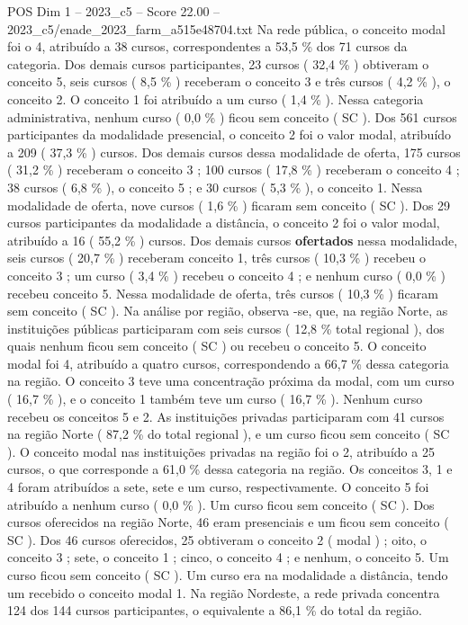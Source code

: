 \begin{textsample}{POS Dim 1 – 2023\_c5 – Score 22.00 – 2023\_c5/enade\_2023\_farm\_a515e48704.txt}
Na rede pública, o conceito modal foi o 4, atribuído a 38 cursos, correspondentes a 53,5 \% dos 71 cursos da categoria.
Dos demais cursos participantes, 23 cursos ( 32,4 \% ) obtiveram o conceito 5, seis cursos ( 8,5 \% ) receberam o conceito 3 e três cursos ( 4,2 \% ), o conceito 2.
O conceito 1 foi atribuído a um curso ( 1,4 \% ).
Nessa categoria administrativa, nenhum curso ( 0,0 \% ) ficou sem conceito ( SC ).
Dos 561 cursos participantes da modalidade presencial, o conceito 2 foi o valor modal, atribuído a 209 ( 37,3 \% ) cursos.
Dos demais cursos dessa modalidade de oferta, 175 cursos ( 31,2 \% ) receberam o conceito 3 ; 100 cursos ( 17,8 \% ) receberam o conceito 4 ; 38 cursos ( 6,8 \% ), o conceito 5 ; e 30 cursos ( 5,3 \% ), o conceito 1.
Nessa modalidade de oferta, nove cursos ( 1,6 \% ) ficaram sem conceito ( SC ).
Dos 29 cursos participantes da modalidade a distância, o conceito 2 foi o valor modal, atribuído a 16 ( 55,2 \% ) cursos.
Dos demais cursos \textbf{ofertados} nessa modalidade, seis cursos ( 20,7 \% ) receberam conceito 1, três cursos ( 10,3 \% ) recebeu o conceito 3 ; um curso ( 3,4 \% ) recebeu o conceito 4 ; e nenhum curso ( 0,0 \% ) recebeu conceito 5.
Nessa modalidade de oferta, três cursos ( 10,3 \% ) ficaram sem conceito ( SC ).
Na análise por região, observa -se, que, na região Norte, as instituições públicas participaram com seis cursos ( 12,8 \% total regional ), dos quais nenhum ficou sem conceito ( SC ) ou recebeu o conceito 5.
O conceito modal foi 4, atribuído a quatro cursos, correspondendo a 66,7 \% dessa categoria na região.
O conceito 3 teve uma concentração próxima da modal, com um curso ( 16,7 \% ), e o conceito 1 também teve um curso ( 16,7 \% ).
Nenhum curso recebeu os conceitos 5 e 2.
As instituições privadas participaram com 41 cursos na região Norte ( 87,2 \% do total regional ), e um curso ficou sem conceito ( SC ).
O conceito modal nas instituições privadas na região foi o 2, atribuído a 25 cursos, o que corresponde a 61,0 \% dessa categoria na região.
Os conceitos 3, 1 e 4 foram atribuídos a sete, sete e um curso, respectivamente.
O conceito 5 foi atribuído a nenhum curso ( 0,0 \% ).
Um curso ficou sem conceito ( SC ).
Dos cursos oferecidos na região Norte, 46 eram presenciais e um ficou sem conceito ( SC ).
Dos 46 cursos oferecidos, 25 obtiveram o conceito 2 ( modal ) ; oito, o conceito 3 ; sete, o conceito 1 ; cinco, o conceito 4 ; e nenhum, o conceito 5.
Um curso ficou sem conceito ( SC ).
Um curso era na modalidade a distância, tendo um recebido o conceito modal 1.
Na região Nordeste, a rede privada concentra 124 dos 144 cursos participantes, o equivalente a 86,1 \% do total da região.

\end{textsample}
